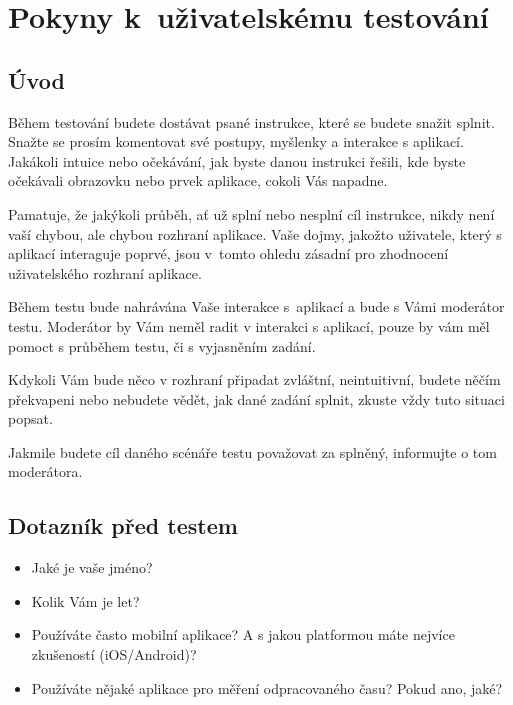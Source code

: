 \chapter{Pokyny k uživatelskému testování}\label{appendix:ui-testing-instructions}

\section*{Úvod}

Během testování budete dostávat psané instrukce, které se budete snažit splnit. Snažte se prosím komentovat své postupy, myšlenky a interakce s aplikací. Jakákoli intuice nebo očekávání, jak byste danou instrukci řešili, kde byste očekávali obrazovku nebo prvek aplikace, cokoli Vás napadne.

Pamatuje, že jakýkoli průběh, ať už splní nebo nesplní cíl instrukce, nikdy není vaší chybou, ale chybou rozhraní aplikace. Vaše dojmy, jakožto uživatele, který s aplikací interaguje poprvé, jsou v tomto ohledu zásadní pro zhodnocení uživatelského rozhraní aplikace.

Během testu bude nahrávána Vaše interakce s aplikací a bude s Vámi moderátor testu. Moderátor by Vám neměl radit v interakci s aplikací, pouze by vám měl pomoct s průběhem testu, či s vyjasněním zadání.

Kdykoli Vám bude něco v rozhraní připadat zvláštní, neintuitivní, budete něčím překvapeni nebo nebudete vědět, jak dané zadání splnit, zkuste vždy tuto situaci popsat.

Jakmile budete cíl daného scénáře testu považovat za splněný, informujte o tom moderátora.

\section*{Dotazník před testem}

\begin{itemize}
\item Jaké je vaše jméno?
\item Kolik Vám je let?
\item Používáte často mobilní aplikace? A s jakou platformou máte nejvíce zkušeností (iOS/Android)?
\item Používáte nějaké aplikace pro měření odpracovaného času? Pokud ano, jaké?
\end{itemize}


